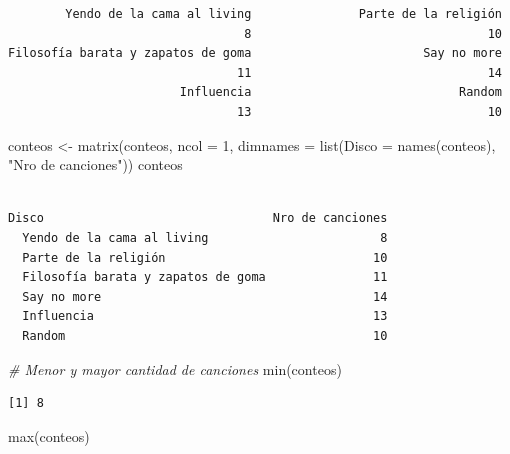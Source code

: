 \documentclass[
]{book}
\newenvironment{Shaded}{\begin{snugshade}}{\end{snugshade}}
\newcommand{\AttributeTok}[1]{\textcolor[rgb]{0.77,0.63,0.00}{#1}}
\newcommand{\CommentTok}[1]{\textcolor[rgb]{0.56,0.35,0.01}{\textit{#1}}}
\newcommand{\DecValTok}[1]{\textcolor[rgb]{0.00,0.00,0.81}{#1}}
\newcommand{\FunctionTok}[1]{\textcolor[rgb]{0.00,0.00,0.00}{#1}}
\newcommand{\NormalTok}[1]{#1}
\newcommand{\OtherTok}[1]{\textcolor[rgb]{0.56,0.35,0.01}{#1}}
\newcommand{\StringTok}[1]{\textcolor[rgb]{0.31,0.60,0.02}{#1}}
\begin{document}
\begin{verbatim}
        Yendo de la cama al living               Parte de la religión 
                                 8                                 10 
Filosofía barata y zapatos de goma                        Say no more 
                                11                                 14 
                        Influencia                             Random 
                                13                                 10 
\end{verbatim}

\begin{Shaded}
\begin{Highlighting}[]
\NormalTok{conteos }\OtherTok{\textless{}{-}} \FunctionTok{matrix}\NormalTok{(conteos, }\AttributeTok{ncol =} \DecValTok{1}\NormalTok{,}
                  \AttributeTok{dimnames =} \FunctionTok{list}\NormalTok{(}\AttributeTok{Disco =} \FunctionTok{names}\NormalTok{(conteos), }\StringTok{"Nro de canciones"}\NormalTok{))}
\NormalTok{conteos}
\end{Highlighting}
\end{Shaded}

\begin{verbatim}
                                    
Disco                                Nro de canciones
  Yendo de la cama al living                        8
  Parte de la religión                             10
  Filosofía barata y zapatos de goma               11
  Say no more                                      14
  Influencia                                       13
  Random                                           10
\end{verbatim}

\begin{Shaded}
\begin{Highlighting}[]
\CommentTok{\# Menor y mayor cantidad de canciones}
\FunctionTok{min}\NormalTok{(conteos)}
\end{Highlighting}
\end{Shaded}

\begin{verbatim}
[1] 8
\end{verbatim}

\begin{Shaded}
\begin{Highlighting}[]
\FunctionTok{max}\NormalTok{(conteos)}
\end{Highlighting}
\end{Shaded}
\end{document}
